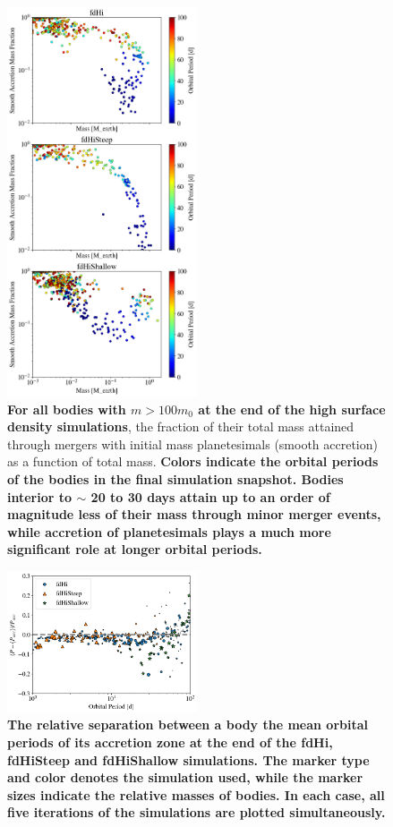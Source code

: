\documentclass[twocolumn,linenumbers]{aastex63}
\begin{document}
\begin{figure}
\begin{center}
    \includegraphics[width=0.5\textwidth]{figures/minor_frac.png}
    \caption{\textbf{For all bodies with $m > 100 m_{0}$ at the end of the high surface density simulations}, the fraction of their total mass attained through mergers with initial mass planetesimals (smooth accretion) as a function of total mass. \textbf{Colors indicate the orbital periods of the bodies in the final simulation snapshot. Bodies interior to $\sim$ 20 to 30 days attain up to an order of magnitude less of their mass through minor merger events, while accretion of planetesimals plays a much more significant role at longer orbital periods.}\label{fig:minor_frac}}
\end{center}
\end{figure}

\begin{figure}
\begin{center}
    \includegraphics[width=0.5\textwidth]{figures/acc_zones.png}
    \caption{\textbf{The relative separation between a body the mean orbital periods of its accretion zone at the end of the fdHi, fdHiSteep and fdHiShallow simulations. The marker type and color denotes the simulation used, while the marker sizes indicate the relative masses of bodies. In each case, all five iterations of the simulations are plotted simultaneously.}\label{fig:acc_zones}}
\end{center}
\end{figure}
\end{document}
